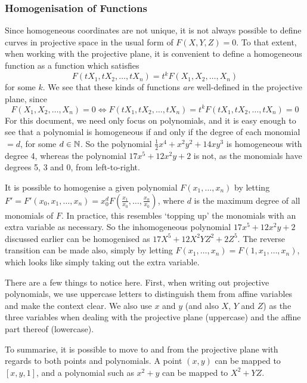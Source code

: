 \subsubsection{Homogenisation of Functions}
Since homogeneous coordinates are not unique, it is not always possible to define curves in projective space in the usual form of $F(X,Y,Z)=0$. To that extent, when working with the projective plane, it is convenient to define a homogeneous function as a function which satisfies
$$F(tX_1,tX_2,\ldots,tX_n)=t^k F(X_1,X_2,\ldots,X_n)$$
for some $k$. We see that these kinds of functions \emph{are} well-defined in the projective plane, since
$$F(X_1,X_2,\ldots,X_n)=0 \Leftrightarrow F(tX_1,tX_2,\ldots,tX_n) = t^k F(tX_1,tX_2,\ldots,tX_n) = 0$$
For this document, we need only focus on polynomials, and it is easy enough to see that a polynomial is homogeneous if and only if the degree of each monomial $= d$, for some $d \in \mathbb{N}$.
So the polynomial $\frac{1}{2}x^4 + x^2y^2 + 14xy^3$ is homogeneous with degree 4, whereas the polynomial $17x^5 + 12x^2y + 2$ is not, as the monomials have degrees 5, 3 and 0, from left-to-right.

It is possible to homogenise a given polynomial $F(x_1,\ldots,x_n)$ by letting $F' = F'(x_0,x_1,\ldots,x_n) = x_0^d F(\frac{x_1}{x_0},\ldots,\frac{x_n}{x_0})$, where $d$ is the maximum degree of all monomials of $F$. In practice, this resembles `topping up' the monomials with an extra variable as necessary.
So the inhomogeneous polynomial $17x^5 + 12x^2y + 2$ discussed earlier can be homogenised as $17X^5 + 12X^2YZ^2 + 2Z^5$.
The reverse transition can be made also, simply by letting $F(x_1,\ldots,x_n) = F(1,x_1,\ldots,x_n)$, which looks like simply taking out the extra variable.

There are a few things to notice here.
First, when writing out projective polynomials, we use uppercase letters to distinguish them from affine variables and make the context clear.
We also use $x$ and $y$ (and also $X$, $Y$ and $Z$) as the three variables when dealing with the projective plane (uppercase) and the affine part thereof (lowercase).

To summarise, it is possible to move to and from the projective plane with regards to both points and polynomials.
A point $(x,y)$ can be mapped to $[x,y,1]$, and a polynomial such as $x^2 + y$ can be mapped to $X^2 + YZ$.

